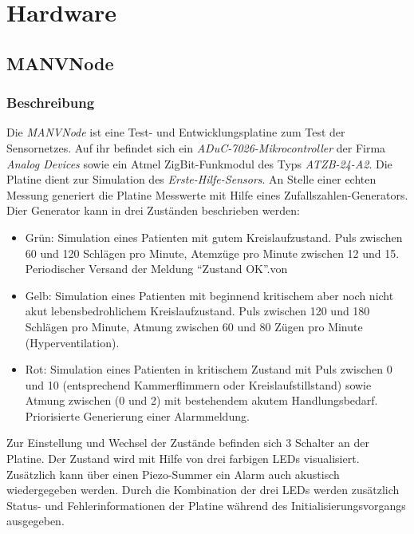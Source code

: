 \section{Hardware}
\subsection{MANVNode}
\subsubsection{Beschreibung}
Die \emph{MANVNode} ist eine Test- und Entwicklungsplatine zum Test der Sensornetzes. Auf ihr befindet sich ein 
\emph{ADuC-7026-Mikrocontroller} der Firma \emph{Analog Devices} sowie ein Atmel ZigBit-Funkmodul des Typs \emph{ATZB-24-A2}. 
Die Platine dient zur Simulation des \emph{Erste-Hilfe-Sensors}. An Stelle einer echten Messung generiert die 
Platine Messwerte mit Hilfe eines Zufallszahlen-Generators.  Dier Generator kann in drei Zuständen beschrieben werden:

\begin{itemize}
    \item{Grün:} Simulation eines Patienten mit gutem Kreislaufzustand. Puls zwischen 60 und 120 Schlägen pro Minute, 
                 Atemzüge pro Minute zwischen 12 und 15. Periodischer Versand der Meldung "`Zustand OK"'.von 
    \item{Gelb:} Simulation eines Patienten mit beginnend kritischem aber noch nicht akut lebensbedrohlichem 
                 Kreislaufzustand. Puls zwischen 120 und 180 Schlägen pro Minute, Atmung zwischen 60 und 80
                 Zügen pro Minute (Hyperventilation).
    \item{Rot:}  Simulation eines Patienten in kritischem Zustand mit Puls zwischen 0 und 10 (entsprechend
                 Kammerflimmern oder Kreislaufstillstand) sowie Atmung zwischen (0 und 2) mit bestehendem
                 akutem Handlungsbedarf. Priorisierte Generierung einer Alarmmeldung.
\end{itemize}

Zur Einstellung und Wechsel der Zustände befinden sich 3 Schalter an der Platine. Der Zustand wird mit Hilfe von
drei farbigen LEDs visualisiert. Zusätzlich kann über einen Piezo-Summer ein Alarm auch akustisch wiedergegeben werden.
Durch die Kombination der drei LEDs werden zusätzlich Status- und Fehlerinformationen der Platine während des 
Initialisierungsvorgangs ausgegeben.

